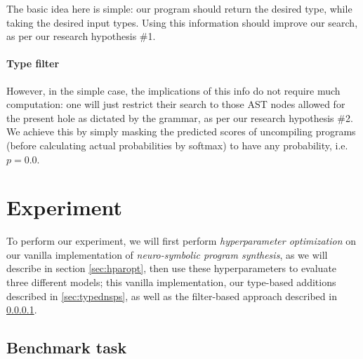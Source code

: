 \documentclass{article}
\begin{document}
The basic idea here is simple: our program should return the desired type, while taking the desired input types.
Using this information should improve our search,
as per our research hypothesis \#1.

\paragraph{Type filter} \label{sec:filter}

However, in the simple case, the implications of this info do not require much computation:
one will just restrict their search to those AST nodes allowed for the present hole as dictated by the grammar,
as per our research hypothesis \#2.
We achieve this by simply masking the predicted scores of uncompiling programs
(before calculating actual probabilities by softmax) to have any probability, i.e. $p=0.0$.


\section{Experiment} \label{sec:experiment}

To perform our experiment, we will first perform \emph{hyperparameter optimization} on our vanilla implementation of \emph{neuro-symbolic program synthesis},
as we will describe in section \ref{sec:hparopt},
then use these hyperparameters to evaluate three different models;
this vanilla implementation, our type-based additions described in \ref{sec:typednsps},
as well as the filter-based approach described in \ref{sec:filter}.

\subsection{Benchmark task}
\end{document}
